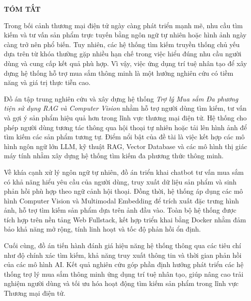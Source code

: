 \begin{center}
    \textbf{\Large TÓM TẮT}
\end{center}

Trong bối cảnh thương mại điện tử ngày càng phát triển mạnh mẽ, nhu cầu tìm kiếm và tư vấn sản phẩm trực tuyến bằng ngôn ngữ tự nhiên hoặc hình ảnh ngày càng trở nên phổ biến. Tuy nhiên, các hệ thống tìm kiếm truyền thống chủ yếu dựa trên từ khóa thường gặp nhiều hạn chế trong việc hiểu đúng nhu cầu người dùng và cung cấp kết quả phù hợp. Vì vậy, việc ứng dụng trí tuệ nhân tạo để xây dựng hệ thống hỗ trợ mua sắm thông minh là một hướng nghiên cứu có tiềm năng và giá trị thực tiễn cao.

Đồ án tập trung nghiên cứu và xây dựng hệ thống \textit{Trợ lý Mua sắm Đa phương tiện sử dụng RAG và Computer Vision} nhằm hỗ trợ người dùng tìm kiếm, tư vấn và gợi ý sản phẩm hiệu quả hơn trong lĩnh vực thương mại điện tử. Hệ thống cho phép người dùng tương tác thông qua hội thoại tự nhiên hoặc tải lên hình ảnh để tìm kiếm các sản phẩm tương tự. Điểm nổi bật của đề tài là việc kết hợp các mô hình ngôn ngữ lớn LLM, kỹ thuật RAG, Vector Database và các mô hình thị giác máy tính nhằm xây dựng hệ thống tìm kiếm đa phương thức thông minh.

Về khía cạnh xử lý ngôn ngữ tự nhiên, đồ án triển khai chatbot tư vấn mua sắm có khả năng hiểu yêu cầu của người dùng, truy xuất dữ liệu sản phẩm và sinh phản hồi phù hợp theo ngữ cảnh hội thoại. Đồng thời, hệ thống áp dụng các mô hình Computer Vision và Multimodal Embedding để trích xuất đặc trưng hình ảnh, hỗ trợ tìm kiếm sản phẩm dựa trên ảnh đầu vào. Toàn bộ hệ thống được tích hợp trên nền tảng Web Fullstack, kết hợp triển khai bằng Docker nhằm đảm bảo khả năng mở rộng, tính linh hoạt và tốc độ phản hồi ổn định.

Cuối cùng, đồ án tiến hành đánh giá hiệu năng hệ thống thông qua các tiêu chí như độ chính xác tìm kiếm, khả năng truy xuất thông tin và thời gian phản hồi của các mô hình AI. Kết quả nghiên cứu góp phần định hướng phát triển các hệ thống trợ lý mua sắm thông minh ứng dụng trí tuệ nhân tạo, giúp nâng cao trải nghiệm người dùng và tối ưu hóa hoạt động tìm kiếm sản phẩm trong lĩnh vực Thương mại điện tử.